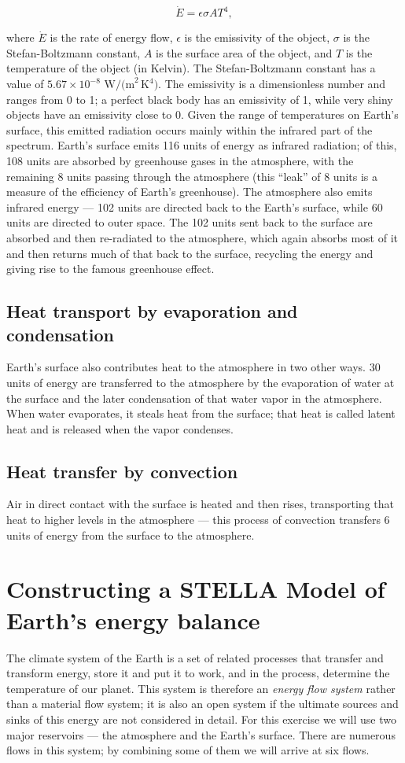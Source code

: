\documentclass[11pt,letterpaper]{article}
\begin{document}
$$\dot{E} = \epsilon\sigma{A}T^4,$$

where $\dot{E}$ is the rate of energy flow, $\epsilon$ is the emissivity of the object, $\sigma$ is the Stefan-Boltzmann constant, $A$ is the
surface area of the object, and $T$ is the temperature of the object (in Kelvin). The Stefan-Boltzmann constant has a value of
$5.67\times{10}^{-8}\mbox{ W/(m}^2\,\mbox{K}^4\mbox{)}$. The emissivity is a dimensionless number and ranges from 0 to 1; a perfect black body has an emissivity of 1, while very shiny objects have an emissivity close to 0. Given the range of temperatures on Earth's surface, this emitted radiation occurs mainly within the infrared part of the spectrum. Earth's
surface emits 116 units of energy as infrared radiation; of this, 108 units are absorbed by greenhouse gases in the atmosphere, with the
remaining 8 units passing through the atmosphere (this ``leak'' of 8 units is a measure of the efficiency of Earth's greenhouse). The
atmosphere also emits infrared energy --- 102 units are directed back to the Earth's surface, while 60 units are directed to outer space. The 102 units sent back to the surface are absorbed and then re-radiated to the atmosphere, which again absorbs most of it and then returns much of
that back to the surface, recycling the energy and giving rise to the famous greenhouse effect.

\subsection{Heat transport by evaporation and condensation}
Earth's surface also contributes heat to the atmosphere in two other ways. 30 units of energy are transferred to the atmosphere by the
evaporation of water at the surface and the later condensation of that water vapor in the atmosphere. When water evaporates, it steals
heat from the surface; that heat is called latent heat and is released when the vapor condenses.

\subsection{Heat transfer by convection}
Air in direct contact with the surface is heated and then rises, transporting that heat to higher levels in the atmosphere --- this process of
convection transfers 6 units of energy from the surface to the atmosphere.

\section{Constructing a STELLA Model of Earth's energy balance}
The climate system of the Earth is a set of related processes that transfer and transform energy, store it and put it to work,
and in the process, determine the temperature of our planet. This system is therefore an \textit{energy flow system} rather than a
material flow system; it is also an open system if the ultimate sources and sinks of this energy are not considered in detail. For this exercise we will use two major reservoirs --- the atmosphere and the Earth's surface. There are numerous flows in this system; by combining some of them we will arrive at six flows.
\end{document}
